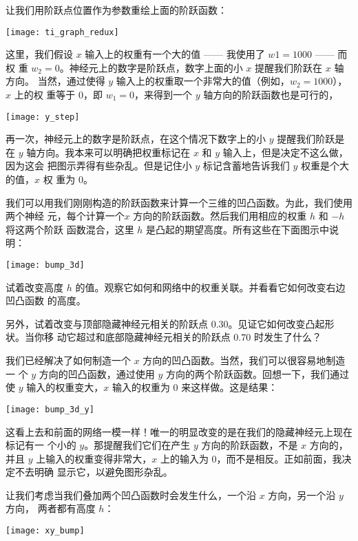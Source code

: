 让我们用阶跃点位置作为参数重绘上面的阶跃函数：
\begin{center}
  \texttt{[image: ti\_graph\_redux]}
\end{center}

这里，我们假设 $x$ 输入上的权重有一个大的值 —— 我使用了 $w1 = 1000$ —— 而权
重 $w_2 = 0$。神经元上的数字是阶跃点，数字上面的小 $x$ 提醒我们阶跃在 $x$ 轴方向。
当然，通过使得 $y$ 输入上的权重取一个非常大的值（例如，$w_2 = 1000$），$x$ 上的权
重等于 $0$，即 $w_1 = 0$，来得到一个 $y$ 轴方向的阶跃函数也是可行的，
\begin{center}
  \texttt{[image: y\_step]}
\end{center}

再一次，神经元上的数字是阶跃点，在这个情况下数字上的小 $y$ 提醒我们阶跃是在 $y$
轴方向。我本来可以明确把权重标记在 $x$ 和 $y$ 输入上，但是决定不这么做，因为这会
把图示弄得有些杂乱。但是记住小 $y$ 标记含蓄地告诉我们 $y$ 权重是个大的值，$x$ 权
重为 $0$。

我们可以用我们刚刚构造的阶跃函数来计算一个三维的凹凸函数。为此，我们使用两个神经
元，每个计算一个$x$ 方向的阶跃函数。然后我们用相应的权重 $h$ 和 $-h$ 将这两个阶跃
函数混合，这里 $h$ 是凸起的期望高度。所有这些在下面图示中说明：
\begin{center}
  \texttt{[image: bump\_3d]}
\end{center}

试着改变高度 $h$ 的值。观察它如何和网络中的权重关联。并看看它如何改变右边凹凸函数
的高度。

另外，试着改变与顶部隐藏神经元相关的阶跃点 $0.30$。见证它如何改变凸起形状。当你移
动它超过和底部隐藏神经元相关的阶跃点 $0.70$ 时发生了什么？

我们已经解决了如何制造一个 $x$ 方向的凹凸函数。当然，我们可以很容易地制造一
个 $y$ 方向的凹凸函数，通过使用 $y$ 方向的两个阶跃函数。回想一下，我们通过使 $y$
输入的权重变大，$x$ 输入的权重为 $0$ 来这样做。这是结果：
\begin{center}
  \texttt{[image: bump\_3d\_y]}
\end{center}

这看上去和前面的网络一模一样！唯一的明显改变的是在我们的隐藏神经元上现在标记有一
个小的 $y$。那提醒我们它们在产生 $y$ 方向的阶跃函数，不是 $x$ 方向的，并且 $y$
上输入的权重变得非常大，$x$ 上的输入为 $0$，而不是相反。正如前面，我决定不去明确
显示它，以避免图形杂乱。

让我们考虑当我们叠加两个凹凸函数时会发生什么，一个沿 $x$ 方向，另一个沿 $y$ 方向，
两者都有高度 $h$：
\begin{center}
  \texttt{[image: xy\_bump]}
\end{center}


